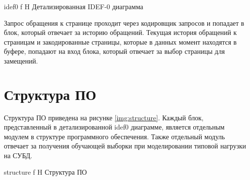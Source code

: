 {idef0} %
{f} %
{H} %
{\textwidth} %
{Детализированная IDEF-0 диаграмма} %

Запрос обращения к странице проходит через кодировщик запросов и попадает в блок, который отвечает за историю обращений.
Текущая история обращений к страницам и закодированные страницы, которые в данных момент находятся в буфере, попадают на вход блока, который отвечает за выбор страницы для замещений.

\section{Структура ПО}

Структура ПО приведена на рисунке \ref{img:structure}.
Каждый блок, представленный в детализированной idef0 диаграмме, является отдельным модулем в структуре программного обеспечения.
Также отдельный модуль отвечает за получения обучающей выборки при моделировании типовой нагрузки на СУБД.

{structure} %
{f} %
{H} %
{\textwidth} %
{Структура ПО} %